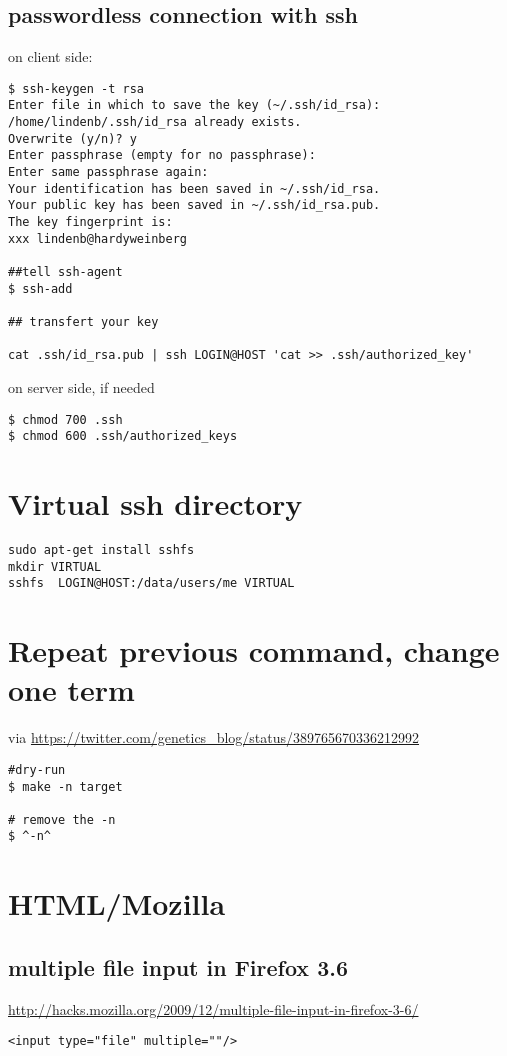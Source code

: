\documentclass[12pt]{article}
\begin{document}
\subsection{passwordless connection with ssh}
on client side:
\begin{lstlisting}
$ ssh-keygen -t rsa
Enter file in which to save the key (~/.ssh/id_rsa): 
/home/lindenb/.ssh/id_rsa already exists.
Overwrite (y/n)? y
Enter passphrase (empty for no passphrase): 
Enter same passphrase again: 
Your identification has been saved in ~/.ssh/id_rsa.
Your public key has been saved in ~/.ssh/id_rsa.pub.
The key fingerprint is:
xxx lindenb@hardyweinberg

##tell ssh-agent
$ ssh-add

## transfert your key

cat .ssh/id_rsa.pub | ssh LOGIN@HOST 'cat >> .ssh/authorized_key'

\end{lstlisting}
on server side, if needed
\begin{lstlisting}
$ chmod 700 .ssh
$ chmod 600 .ssh/authorized_keys
\end{lstlisting}

\section{Virtual ssh directory}
\begin{lstlisting}
sudo apt-get install sshfs
mkdir VIRTUAL
sshfs  LOGIN@HOST:/data/users/me VIRTUAL
\end{lstlisting}


\section{Repeat previous command, change one term}
via \url{https://twitter.com/genetics\_blog/status/389765670336212992}
\begin{lstlisting}
#dry-run
$ make -n target

# remove the -n
$ ^-n^
\end{lstlisting}



\section{HTML/Mozilla}
\subsection{multiple file input in Firefox 3.6}
\url{http://hacks.mozilla.org/2009/12/multiple-file-input-in-firefox-3-6/}
\begin{lstlisting}
<input type="file" multiple=""/>
\end{lstlisting}
\end{document}
